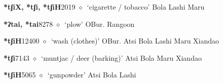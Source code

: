 \begin{list}{}{\leftmargin=1.5em \itemindent=-1.5em}
  \item {\footnotesize \textbf{*tʃiX, *tʃi, *tʃiH}}{\tiny 2019}
\hspace{1ex}
         $\diamond$~`cigarette / tobacco'
         Bola 
\hspace{1ex}
         Lashi 
\hspace{1ex}
         Maru 
  \item {\footnotesize \textbf{*ʔtai, *tai}}{\tiny 8278}
\hspace{1ex}
         $\diamond$~`plow'
         OBur. 
\hspace{1ex}
         Rangoon 
  \item {\footnotesize \textbf{*tʃiH}}{\tiny 12400}
\hspace{1ex}
         $\diamond$~`wash (clothes)'
         OBur. 
\hspace{1ex}
         Atsi 
\hspace{1ex}
         Bola 
\hspace{1ex}
         Lashi 
\hspace{1ex}
         Maru 
\hspace{1ex}
         Xiandao 
  \item {\footnotesize \textbf{*tʃi}}{\tiny 7143}
\hspace{1ex}
         $\diamond$~`muntjac / deer (barking)'
         Atsi 
\hspace{1ex}
         Bola 
\hspace{1ex}
         Maru 
\hspace{1ex}
         Xiandao 
  \item {\footnotesize \textbf{*tʃiH}}{\tiny 5065}
\hspace{1ex}
         $\diamond$~`gunpowder'
         Atsi 
\hspace{1ex}
         Bola 
\hspace{1ex}
         Lashi 

\end{list}
